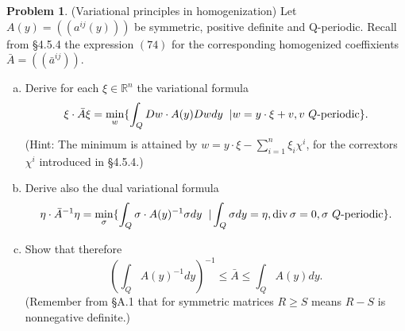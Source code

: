 \documentclass[a4paper]{book}
\numberwithin{equation}{chapter}
\theoremstyle{definition}
\newtheorem{pro}[exm]{Problem}
\begin{document}
\begin{pro}
  (Variational principles in homogenization) Let $A(y) = ((a^{ij}(y)))$ be symmetric, positive definite and Q-periodic. Recall from \S4.5.4 the expression $(74)$ for the corresponding homogenized coeffixients $\bar{A} = ((\bar{a}^{ij}))$.
  \begin{enumerate}[(a)]
  \item Derive for each $\xi \in \mathbb{R}^n$ the variational formula
    \[\xi \cdot \bar{A} \xi = \min\limits_w \{ \int_Q Dw \cdot A(y) Dw dy \left. \right.| w = y\cdot \xi + v, v\ Q\textmd{-periodic}\}.\]
    (Hint: The minimum is attained by $w = y \cdot \xi - \sum_{i = 1}^n \xi_i \chi^i$, for the corrextors $\chi^i$ introduced in \S4.5.4.)

  \item Derive also the dual variational formula
    \[\eta \cdot \bar{A}^{-1} \eta = \min\limits_{\sigma}\{\int _{Q} \sigma \cdot A(y)^{-1} \sigma dy \left. \right.| \int_{Q}\sigma dy = \eta, \operatorname{div}\sigma = 0, \sigma \ Q \textmd{-periodic}\}.\]
    
  \item Show that therefore
    \[\left( \int_Q A(y)^{-1} dy \right)^{-1} \leq \bar{A} \leq \int_Q A(y)dy.\]
    (Remember from \S A.1 that for symmetric matrices $R \geq S$ means $R - S$ is nonnegative definite.)
  \end{enumerate}
\end{pro}
\end{document}

